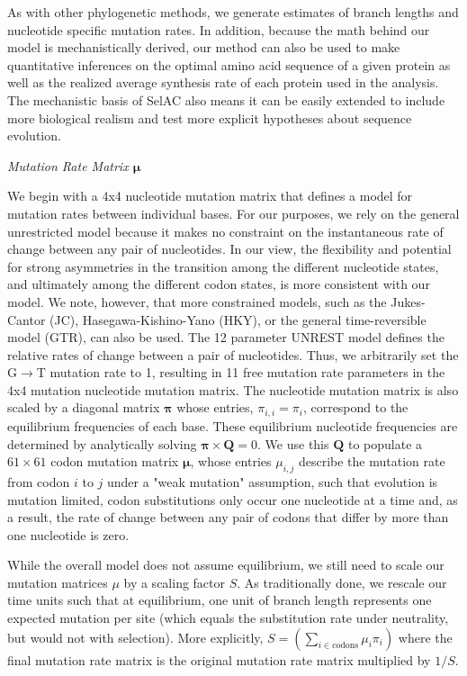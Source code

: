 \documentclass[12pt,letterpaper]{article}
\renewcommand{\subsection}[1]{%
\bigskip
\begin{center}
\begin{large}
\normalfont\itshape #1
\end{large}
\end{center}}
\newcommand{\pimatrix}{\ensuremath{\mathbf{\pi}}\xspace}
\newcommand{\mumatrix}{\ensuremath{\mathbf{\mu}}\xspace}
\newcommand{\Qmatrix}{\ensuremath{\mathbf{Q}}\xspace}
\newcommand{\selac}{SelAC\xspace}
\newcommand{\muij}{\ensuremath{\mu_{i,j}}\xspace}
\begin{document}
As with other phylogenetic methods, we generate estimates of branch lengths and nucleotide specific mutation rates.
In addition, because the math behind our model is mechanistically derived, our method can also be used to make quantitative inferences on the optimal amino acid sequence of a given protein as well as the realized average synthesis rate of each protein used in the analysis.
The mechanistic basis of \selac also means it can be easily extended to include more biological realism and test more explicit hypotheses about sequence evolution.

\subsection{Mutation Rate Matrix \mumatrix}
We begin with a 4x4 nucleotide mutation matrix that defines a model for mutation rates between individual bases.
For our purposes, we rely on the general unrestricted model\citep[UNREST]{Yang1994} because it makes no constraint on the instantaneous rate of change between any pair of nucleotides.
In our view, the flexibility and potential for strong asymmetries in the transition among the different nucleotide states, and ultimately among the different codon states, is more consistent with our model.
We note, however, that more constrained models, such as the Jukes-Cantor (JC), Hasegawa-Kishino-Yano (HKY), or the general time-reversible model (GTR), can also be used.
The 12 parameter UNREST model defines the relative rates of change between a pair of nucleotides.
Thus, we arbitrarily set the G$\rightarrow$T mutation rate to 1, resulting in 11 free mutation rate parameters in the 4x4 mutation nucleotide mutation matrix.
The nucleotide mutation matrix is also scaled by a diagonal matrix \pimatrix whose entries, $\pi_{i,i} = \pi_i$, correspond to the equilibrium frequencies of each base.
These equilibrium nucleotide frequencies are determined by analytically solving $\pimatrix \times \Qmatrix = 0$.
We use this \Qmatrix to populate a $61 \times 61$ codon mutation matrix $\mumatrix$, whose entries $\muij$ describe the mutation rate from codon $i$ to $j$ under a "weak mutation" assumption, such that evolution is mutation limited, codon substitutions only occur one nucleotide at a time and, as a result, the rate of change between any pair of codons that differ by more than one nucleotide is zero.

While the overall model does not assume equilibrium, we still need to scale our mutation matrices $\mu$ by a scaling factor $S$.
As traditionally done, we rescale our time units such that at equilibrium, one unit of branch length represents one expected mutation per site (which equals the substitution rate under neutrality, but would not with selection).
More explicitly, $ S = \left(\sum_{i \in \text{codons}} \mu_i \pi_i\right)$ where the final mutation rate matrix is the original mutation rate matrix multiplied by $1/S$.
\end{document}
